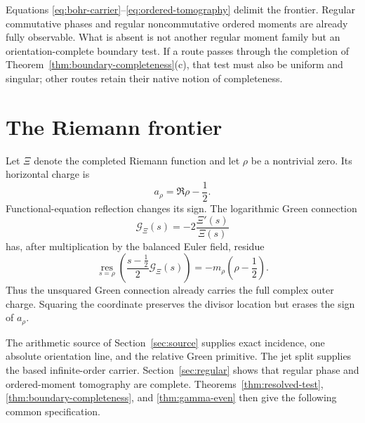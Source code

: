 \documentclass[11pt]{article}
\theoremstyle{definition}
\theoremstyle{remark}
\newcommand{\cG}{\mathcal G}
\begin{document}
Equations \eqref{eq:bohr-carrier}--\eqref{eq:ordered-tomography} delimit the
frontier.  Regular commutative phases and regular noncommutative ordered
moments are already fully observable.  What is absent is not another
regular moment family but an orientation-complete boundary test.  If a route
passes through the completion of Theorem~\ref{thm:boundary-completeness}(c),
that test must also be uniform and singular; other routes retain their native
notion of completeness.

\section{The Riemann frontier}
\label{sec:riemann}

Let \(\Xi\) denote the completed Riemann function and let \(\rho\) be a
nontrivial zero.  Its horizontal charge is
\[
                         a_\rho=\Re\rho-\frac12.
\tag{9.1}\label{eq:horizontal-charge}
\]
Functional-equation reflection changes its sign.  The logarithmic Green
connection
\[
                    \cG_\Xi(s)=-2\frac{\Xi'(s)}{\Xi(s)}
\]
has, after multiplication by the balanced Euler field, residue
\[
 \operatorname*{res}_{s=\rho}
 \left(\frac{s-\frac12}{2}\cG_\Xi(s)\right)
       =-m_\rho\!\left(\rho-\frac12\right).
\tag{9.2}\label{eq:outer-charge}
\]
Thus the unsquared Green connection already carries the full complex outer
charge.  Squaring the coordinate preserves the divisor location but erases
the sign of \(a_\rho\).

The arithmetic source of Section~\ref{sec:source} supplies exact incidence,
one absolute orientation line, and the relative Green primitive.  The jet
split supplies the based infinite-order carrier.  Section~\ref{sec:regular}
shows that regular phase and ordered-moment tomography are complete.
Theorems~\ref{thm:resolved-test}, \ref{thm:boundary-completeness}, and
\ref{thm:gamma-even} then give the following common specification.
\end{document}
